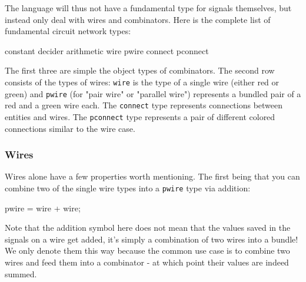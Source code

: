 \documentclass[landscape]{article}
\theoremstyle{plain}
\theoremstyle{definition}
\begin{document}
The language will thus not have a fundamental type for signals themselves, but instead only deal with wires and combinators. Here is the complete list of fundamental circuit network types:
\begin{langname}
constant      decider     arithmetic
wire    pwire    connect    pconnect
\end{langname}
The first three are simple the object types of combinators. The second row consists of the types of wires: \texttt{wire} is the type of a single wire (either red or green) and \texttt{pwire} (for "pair wire" or "parallel wire") represents a bundled pair of a red and a green wire each. The \texttt{connect} type represents connections between entities and wires. The \texttt{pconnect} type represents a pair of different colored connections similar to the wire case. 
\subsubsection{Wires}
Wires alone have a few properties worth mentioning. The first being that you can combine two of the single wire types into a \texttt{pwire} type via addition: 
\begin{langname}
pwire = wire + wire;
\end{langname}
Note that the addition symbol here does not mean that the values saved in the signals on a wire get added, it's simply a combination of two wires into a bundle! We only denote them this way because the common use case is to combine two wires and feed them into a combinator - at which point their values are indeed summed.
\end{document}
